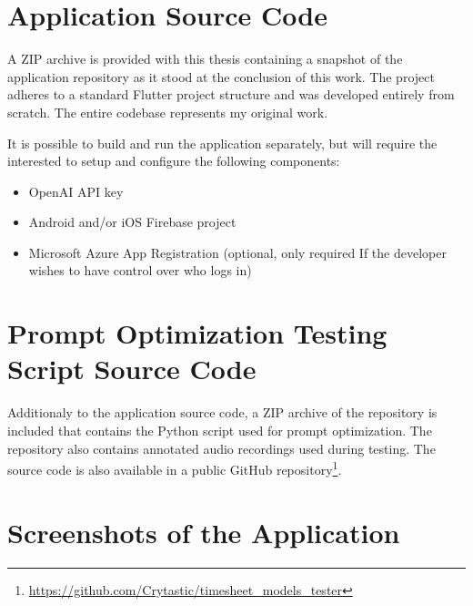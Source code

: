 \documentclass[
  digital,     %
  oneside,     %
  nosansbold,  %
  nocolorbold, %
  lof,         %
  lot,         %
]{fithesis4}
\begin{document}
\appendix %
\chapter{Application Source Code}
A ZIP archive is provided with this thesis containing a snapshot of the application repository as it stood at the conclusion of this work. The project adheres to a standard Flutter project structure and was developed entirely from scratch. The entire codebase represents my original work.

It is possible to build and run the application separately, but will require the interested to setup and configure the following components:
\begin{itemize}
  \item OpenAI API key
  \item Android and/or iOS Firebase project
  \item Microsoft Azure App Registration (optional, only required If the developer wishes to have control over who logs in)
\end{itemize}

\chapter{Prompt Optimization Testing Script Source Code}
Additionaly to the application source code, a ZIP archive of the repository is included that contains the Python script used for prompt optimization. The repository also contains annotated audio recordings used during testing. The source code is also available in a public GitHub repository\footnote{
\url{https://github.com/Crytastic/timesheet_models_tester}
}.

\chapter{Screenshots of the Application}
\end{document}
